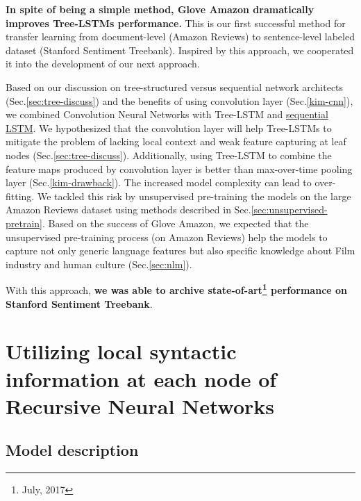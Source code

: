\begin{description}
\textbf{In spite of being a simple method, Glove Amazon dramatically improves Tree-LSTMs performance.}
This is our first successful method for transfer learning from document-level (Amazon Reviews) to sentence-level labeled dataset (Stanford Sentiment Treebank).
Inspired by this approach, we cooperated it into the development of our next approach.

\item[\deschyperlink{sec:CNNtree}{Combining Recursive Neural Networks with Convolution Neural Networks}] \label{conv-tree-benefits} Based on our discussion on tree-structured versus sequential network architects (Sec.\ref{sec:tree-discuss}) and the benefits of using convolution layer (Sec.\ref{kim-cnn}), we combined Convolution Neural Networks with Tree-LSTM and \hyperref[sec:lstm]{sequential LSTM}.
We hypothesized that the convolution layer will help Tree-LSTMs to mitigate the problem of lacking local context and weak feature capturing at leaf nodes (Sec.\ref{sec:tree-discuss}).
Additionally, using Tree-LSTM to combine the feature maps produced by convolution layer is better than max-over-time pooling layer (Sec.\ref{kim-drawback}).
The increased model complexity can lead to over-fitting.
We tackled this risk by unsupervised pre-training the models on the large Amazon Reviews dataset using methods described in Sec.\ref{sec:unsupervised-pretrain}.
Based on the success of Glove Amazon, we expected that the unsupervised pre-training process (on Amazon Reviews) help the models to capture not only generic language features but also specific knowledge about Film industry and human culture (Sec.\ref{sec:nlm}).

With this approach, \textbf{we was able to archive state-of-art\footnote{July, 2017} performance on Stanford Sentiment Treebank}.
\end{description}


\hypertarget{sec:VTtree}{\section{Utilizing local  syntactic information at each node of Recursive Neural Networks}}\label{sec:VTtree}
\subsection{Model description}

